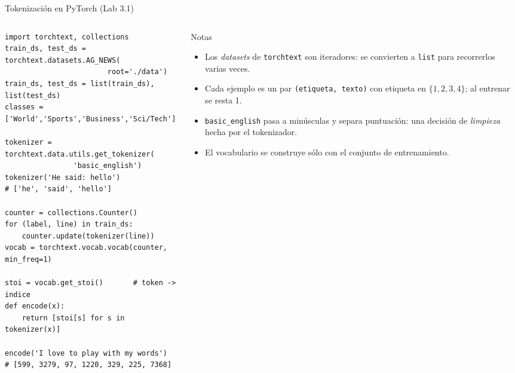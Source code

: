\documentclass[aspectratio=169, 10pt]{beamer}
\begin{document}
\begin{frame}[fragile]{Tokenizaci\'on en PyTorch (Lab 3.1)}

	\begin{columns}[T]
		\begin{column}{0.55\textwidth}
			\begin{tcolorbox}[codebox]
\scriptsize
\begin{verbatim}
import torchtext, collections
train_ds, test_ds = torchtext.datasets.AG_NEWS(
                        root='./data')
train_ds, test_ds = list(train_ds), list(test_ds)
classes = ['World','Sports','Business','Sci/Tech']

tokenizer = torchtext.data.utils.get_tokenizer(
                'basic_english')
tokenizer('He said: hello')
# ['he', 'said', 'hello']

counter = collections.Counter()
for (label, line) in train_ds:
    counter.update(tokenizer(line))
vocab = torchtext.vocab.vocab(counter, min_freq=1)

stoi = vocab.get_stoi()       # token -> indice
def encode(x):
    return [stoi[s] for s in tokenizer(x)]

encode('I love to play with my words')
# [599, 3279, 97, 1220, 329, 225, 7368]
\end{verbatim}
			\end{tcolorbox}
		\end{column}

		\begin{column}{0.42\textwidth}
			\begin{block}{Notas}
				\small
				\begin{itemize}
					\item Los \emph{datasets} de \texttt{torchtext} son iteradores: se convierten a \texttt{list} para recorrerlos varias veces.
					\item Cada ejemplo es un par \texttt{(etiqueta, texto)} con etiqueta en $\{1,2,3,4\}$; al entrenar se resta 1.
					\item \texttt{basic\_english} pasa a min\'usculas y separa puntuaci\'on: una decisi\'on de \emph{limpieza} hecha por el tokenizador.
					\item El vocabulario se construye s\'olo con el conjunto de entrenamiento.
				\end{itemize}
			\end{block}
		\end{column}
	\end{columns}

\end{frame}
\end{document}
